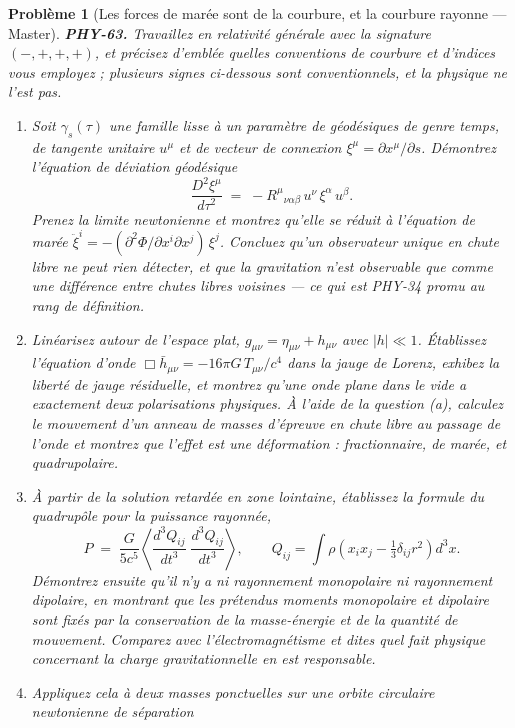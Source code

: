 \documentclass[11pt]{article}
\newtheorem{problem}{Problème}
\begin{document}
\begin{problem}[{Les forces de marée sont de la courbure, et la courbure rayonne --- Master}]
\textbf{PHY-63.} Travaillez en relativité générale avec la signature $ (-,+,+,+) $, et
précisez d'emblée quelles conventions de courbure et d'indices vous employez ; plusieurs signes
ci-dessous sont conventionnels, et la physique ne l'est pas.
\begin{enumerate}
\item[(a)] Soit $ \gamma_{s}(\tau) $ une famille lisse à un paramètre de géodésiques de genre temps, de
tangente unitaire $ u^{\mu} $ et de vecteur de connexion
$ \xi^{\mu} = \partial x^{\mu}/\partial s $. Démontrez l'équation de déviation géodésique
\[ \frac{D^{2}\xi^{\mu}}{d\tau^{2}} \;=\; -R^{\mu}{}_{\nu\alpha\beta}\,u^{\nu}\,\xi^{\alpha}\,u^{\beta}. \]
Prenez la limite newtonienne et montrez qu'elle se réduit à l'équation de marée
$ \ddot{\xi}^{i} = -(\partial^{2}\Phi/\partial x^{i}\partial x^{j})\,\xi^{j} $. Concluez qu'un
observateur unique en chute libre ne peut rien détecter, et que la gravitation n'est observable
que comme une \textit{différence} entre chutes libres voisines --- ce qui est PHY-34 promu au rang de
définition.
\item[(b)] Linéarisez autour de l'espace plat, $ g_{\mu\nu} = \eta_{\mu\nu} + h_{\mu\nu} $ avec
$ |h| \ll 1 $. Établissez l'équation d'onde $ \Box \bar{h}_{\mu\nu} = -16\pi G\,T_{\mu\nu}/c^{4} $
dans la jauge de Lorenz, exhibez la liberté de jauge résiduelle, et montrez qu'une onde plane dans
le vide a exactement deux polarisations physiques. À l'aide de la question (a), calculez le
mouvement d'un anneau de masses d'épreuve en chute libre au passage de l'onde et montrez que
l'effet est une \textit{déformation} : fractionnaire, de marée, et quadrupolaire.
\item[(c)] À partir de la solution retardée en zone lointaine, établissez la formule du quadrupôle pour
la puissance rayonnée,
\[ P \;=\; \frac{G}{5c^{5}}\left\langle \frac{d^{3}Q_{ij}}{dt^{3}}\;
\frac{d^{3}Q_{ij}}{dt^{3}} \right\rangle, \qquad
Q_{ij} = \int \rho\left(x_{i}x_{j} - \tfrac{1}{3}\delta_{ij}r^{2}\right)d^{3}x . \]
Démontrez ensuite qu'il n'y a ni rayonnement monopolaire ni rayonnement dipolaire, en montrant que
les prétendus moments monopolaire et dipolaire sont fixés par la conservation de la masse-énergie
et de la quantité de mouvement. Comparez avec l'électromagnétisme et dites quel fait physique
concernant la charge gravitationnelle en est responsable.
\item[(d)] Appliquez cela à deux masses ponctuelles sur une orbite circulaire newtonienne de séparation

\end{enumerate}
\end{problem}
\end{document}
